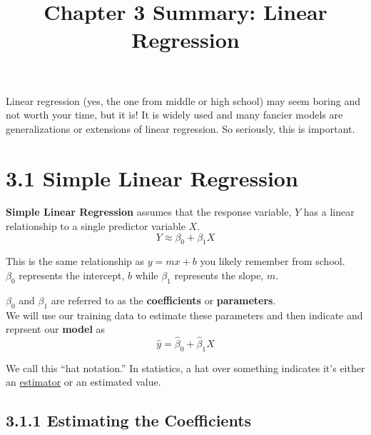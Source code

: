 
\title{Chapter 3 Summary: Linear Regression}

    \maketitle

        Linear regression (yes, the one from middle or high school) may seem boring and not worth your time, but it is! 
        It is widely used and many    fancier models are generalizations or extensions of linear regression.    So seriously, this is important.
        \section*{3.1 Simple Linear Regression}
        \textbf{Simple Linear Regression} assumes that the response variable, \(Y\) has a linear relationship to a single predictor variable \(X\).
        \begin{equation*}\tag{3.1}
            Y \approx \beta_0 + \beta_1 X
        \end{equation*}
        
        
        \begin{note}
            This is the same relationship as \(y=mx+b\) you likely remember from school.\\
            \(\beta_0\) represents the intercept, \(b\) while \(\beta_1\) represents the slope, \(m\).
        \end{note}
        
        \(\beta_0\) and \(\beta_1\) are referred to as the \textbf{coefficients} or \textbf{parameters}.\\
        We will use our training data to estimate these parameters and then indicate and reprsent our \textbf{model} as
        \begin{equation*}\tag{3.2}
            \hat y = \hat \beta_0 + \hat \beta_1 X
        \end{equation*}

        \begin{note}
            We call this ``hat notation.'' In statistics, a hat over something indicates it's either an
            \href{https://en.wikipedia.org/wiki/Estimator}{estimator} or an estimated value.
        \end{note}
        
        \subsection*{3.1.1  Estimating the Coefficients}\label{estimating-the-coefficients}
        
